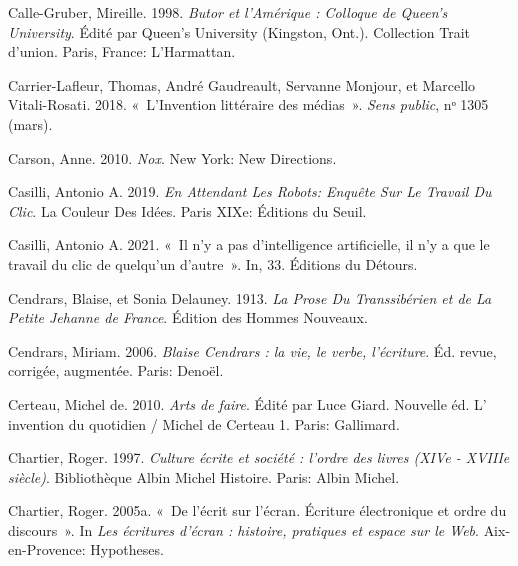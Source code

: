 \begin{CSLReferences}{1}{0}
\leavevmode{}%
Calle-Gruber, Mireille. 1998. \emph{Butor et l'{Am{é}rique} : Colloque
de {Queen}'s {University}}. Édité par Queen's University (Kingston,
Ont.). Collection {Trait} d'union. {Paris, France}: {L'Harmattan}.

\leavevmode{}%
Carrier-Lafleur, Thomas, André Gaudreault, Servanne Monjour, et Marcello
Vitali-Rosati. 2018. {«~{L'Invention litt{é}raire des m{é}dias}~»}.
\emph{Sens public}, nᵒ 1305 (mars).

\leavevmode{}%
Carson, Anne. 2010. \emph{Nox}. {New York}: {New Directions}.

\leavevmode{}%
Casilli, Antonio A. 2019. \emph{En Attendant Les Robots: Enqu{ê}te Sur
Le Travail Du Clic}. La {Couleur} Des Id{é}es. {Paris XIXe}: {{É}ditions
du Seuil}.

\leavevmode{}%
Casilli, Antonio A. 2021. {«~{Il n'y a pas d'intelligence artificielle,
il n'y a que le travail du clic de quelqu'un d'autre}~»}. In, 33.
{{É}ditions du D{é}tours}.

\leavevmode{}%
Cendrars, Blaise, et Sonia Delauney. 1913. \emph{La Prose Du
{Transsib{é}rien} et de La {Petite Jehanne} de {France}}. {{É}dition des
Hommes Nouveaux}.

\leavevmode{}%
Cendrars, Miriam. 2006. \emph{{Blaise Cendrars : la vie, le verbe,
l'{é}criture}}. {É}d. revue, corrig{é}e, augment{é}e. {Paris}:
{Deno{ë}l}.

\leavevmode{}%
Certeau, Michel de. 2010. \emph{{Arts de faire}}. Édité par Luce Giard.
Nouvelle {é}d. {L' invention du quotidien / Michel de Certeau} 1.
{Paris}: {Gallimard}.

\leavevmode{}%
Chartier, Roger. 1997. \emph{{Culture {é}crite et soci{é}t{é} : l'ordre
des livres (XIVe - XVIIIe si{è}cle)}}. {Biblioth{è}que Albin Michel
Histoire}. {Paris}: {Albin Michel}.

\leavevmode{}%
Chartier, Roger. 2005a. {«~{De l'{é}crit sur l'{é}cran. {É}criture
{é}lectronique et ordre du discours}~»}. In \emph{{Les {é}critures
d'{é}cran : histoire, pratiques et espace sur le Web}}.
{Aix-en-Provence}: {Hypotheses}.


\end{CSLReferences}
